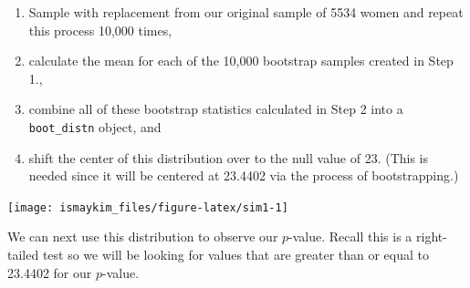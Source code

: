 \documentclass[]{tufte-book}
\newenvironment{Shaded}{\begin{snugshade}}{\end{snugshade}}
\newcommand{\KeywordTok}[1]{\textcolor[rgb]{0.13,0.29,0.53}{\textbf{{#1}}}}
\newcommand{\DataTypeTok}[1]{\textcolor[rgb]{0.13,0.29,0.53}{{#1}}}
\newcommand{\DecValTok}[1]{\textcolor[rgb]{0.00,0.00,0.81}{{#1}}}
\newcommand{\StringTok}[1]{\textcolor[rgb]{0.31,0.60,0.02}{{#1}}}
\newcommand{\OtherTok}[1]{\textcolor[rgb]{0.56,0.35,0.01}{{#1}}}
\newcommand{\NormalTok}[1]{{#1}}
\providecommand{\tightlist}{%
  \setlength{\itemsep}{0pt}\setlength{\parskip}{0pt}}
\begin{document}
\begin{enumerate}
\def\labelenumi{\arabic{enumi}.}
\tightlist
\item
  Sample with replacement from our original sample of 5534 women and
  repeat this process 10,000 times,
\item
  calculate the mean for each of the 10,000 bootstrap samples created in
  Step 1.,
\item
  combine all of these bootstrap statistics calculated in Step 2 into a
  \texttt{boot\_distn} object, and
\item
  shift the center of this distribution over to the null value of 23.
  (This is needed since it will be centered at 23.4402 via the process
  of bootstrapping.)
\end{enumerate}

\begin{Shaded}
\end{Shaded}

\begin{center}\texttt{[image: ismaykim\_files/figure-latex/sim1-1]} \end{center}

We can next use this distribution to observe our \(p\)-value. Recall
this is a right-tailed test so we will be looking for values that are
greater than or equal to 23.4402 for our \(p\)-value.

\begin{Shaded}
\end{Shaded}
\end{document}
